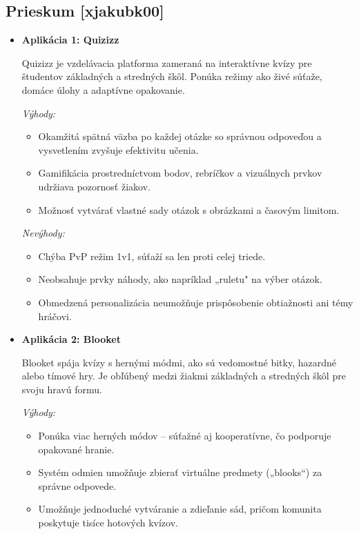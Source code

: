\documentclass[a4paper,12pt]{article}
\begin{document}
    	
    	\subsection{Prieskum [xjakubk00]}
 \renewcommand{\labelitemi}{$\bullet$}
\renewcommand{\labelitemii}{$\bullet$}

\begin{itemize}
	\item \textbf{Aplikácia 1: Quizizz}  

	      Quizizz je vzdelávacia platforma zameraná na interaktívne kvízy pre študentov základných a stredných škôl. Ponúka režimy ako živé súťaže, domáce úlohy a adaptívne opakovanie.  

	      \textit{Výhody:}
	      \begin{itemize}
	      	\item Okamžitá spätná väzba po každej otázke so správnou odpoveďou a vysvetlením zvyšuje efektivitu učenia.
	      	\item Gamifikácia prostredníctvom bodov, rebríčkov a vizuálnych prvkov udržiava pozornosť žiakov.
	      	\item Možnosť vytvárať vlastné sady otázok s obrázkami a časovým limitom.
	      \end{itemize}

	      \textit{Nevýhody:}
	      \begin{itemize}
	      	\item Chýba PvP režim 1v1, súťaží sa len proti celej triede.
	      	\item Neobsahuje prvky náhody, ako napríklad „ruletu" na výber otázok.
	      	\item Obmedzená personalizácia neumožňuje prispôsobenie obtiažnosti ani témy hráčovi.
	      \end{itemize}

	\item \textbf{Aplikácia 2: Blooket}  

	      Blooket spája kvízy s hernými módmi, ako sú vedomostné bitky, hazardné alebo tímové hry. Je obľúbený medzi žiakmi základných a stredných škôl pre svoju hravú formu.  

	      \textit{Výhody:}
	      \begin{itemize}
	      	\item Ponúka viac herných módov – súťažné aj kooperatívne, čo podporuje opakované hranie.
	      	\item Systém odmien umožňuje zbierať virtuálne predmety („blooks“) za správne odpovede.
	      	\item Umožňuje jednoduché vytváranie a zdieľanie sád, pričom komunita poskytuje tisíce hotových kvízov.
	      \end{itemize}


\end{itemize}
\end{document}
